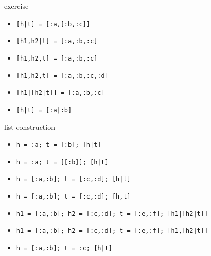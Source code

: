\begin{frame}{exercise}
\begin{itemize}
\pause \item  {\tt [h|t] = [:a,[:b,:c]]}  
\pause \item  {\tt [h1,h2|t] = [:a,:b,:c]} 
\pause \item  {\tt [h1,h2,t] = [:a,:b,:c]} 
\pause \item  {\tt [h1,h2,t] = [:a,:b,:c,:d]} 
\pause \item  {\tt [h1|[h2|t]] = [:a,:b,:c]}
\pause \item  {\tt [h|t] = [:a|:b]}
\end{itemize}
\end{frame}

\begin{frame}{list construction}
\begin{itemize}
\pause \item  {\tt h = :a; t = [:b]; [h|t]}
\pause \item  {\tt h = :a; t = [[:b]]; [h|t]}
\pause \item  {\tt h = [:a,:b]; t = [:c,:d]; [h|t]}
\pause \item  {\tt h = [:a,:b]; t = [:c,:d]; [h,t]}
\pause \item  {\tt h1 = [:a,:b]; h2 = [:c,:d]; t = [:e,:f]; [h1|[h2|t]]}
\pause \item  {\tt h1 = [:a,:b]; h2 = [:c,:d]; t = [:e,:f]; [h1,[h2|t]]}
\pause \item  {\tt h = [:a,:b]; t = :c; [h|t]}
\end{itemize}
\end{frame}


